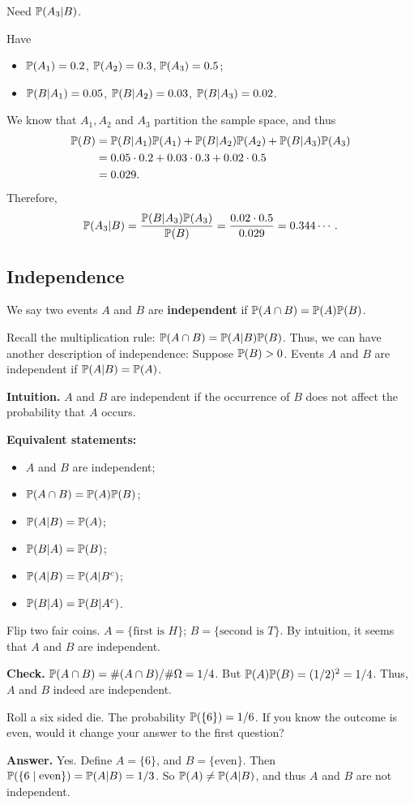 Need $\mathbb{P}(A_3|B)$.

Have
\begin{itemize}
\item $\mathbb{P}(A_1) = 0.2$, $\mathbb{P}(A_2) = 0.3$, $\mathbb{P}(A_3) = 0.5$;
\item $\mathbb{P}(B|A_1) = 0.05$, $\mathbb{P}(B|A_2) = 0.03$, $\mathbb{P}(B|A_3) = 0.02$.
\end{itemize}
We know that $A_1,A_2$ and $A_3$ partition the sample space, and thus
\begin{align*}
  \mathbb{P}(B) & = \mathbb{P}(B|A_1)\mathbb{P}(A_1)+\mathbb{P}(B|A_2)\mathbb{P}(A_2) + \mathbb{P}(B|A_3)\mathbb{P}(A_3)\\
         & = 0.05\cdot 0.2 + 0.03\cdot 0.3 + 0.02 \cdot 0.5\\
  & = 0.029.
\end{align*}
Therefore,
\[
  \mathbb{P}(A_3|B) = \frac{\mathbb{P}(B|A_3)\mathbb{P}(A_3)}{\mathbb{P}(B)} = \frac{0.02\cdot 0.5}{0.029} = 0.344\cdots.
\]
\subsection{Independence}
\label{subsec:indep}
\begin{definition}
  We say two events $A$ and $B$ are \textbf{independent} if $\mathbb{P}(A\cap B) = \mathbb{P}(A)\mathbb{P}(B)$.
\end{definition}
Recall the multiplication rule: $\mathbb{P}(A\cap B) = \mathbb{P}(A|B) \mathbb{P}(B)$. Thus, we can
have another description of independence: Suppose $\mathbb{P}(B)>0$. Events $A$ and $B$
are independent if $\mathbb{P}(A|B) = \mathbb{P}(A)$.

\textbf{Intuition.} $A$ and $B$ are independent if the occurrence of $B$ does
not affect the probability that $A$ occurs.

\textbf{Equivalent statements:}
\begin{itemize}
\item $A$ and $B$ are independent;
\item $\mathbb{P}(A\cap B) = \mathbb{P}(A)\mathbb{P}(B)$;
\item $\mathbb{P}(A|B) = \mathbb{P}(A)$;
\item $\mathbb{P}(B|A) = \mathbb{P}(B)$;
\item $\mathbb{P}(A|B) = \mathbb{P}(A|B^c)$;
\item $\mathbb{P}(B|A) = \mathbb{P}(B|A^c)$.
\end{itemize}
\begin{example}
  Flip two fair coins. $A=\{\text{first is $H$}\}$; $B=\{\text{second is
    $T$}\}$. By intuition, it seems that $A$ and $B$ are independent.
\end{example}
\textbf{Check.} $\mathbb{P}(A\cap B) = \# (A\cap B)/\# \Omega = 1/4$. But $\mathbb{P}(A)
\mathbb{P}(B) = (1/2)^2 = 1/4$. Thus, $A$ and $B$ indeed are independent.
\begin{example}
  Roll a six sided die. The probability $\mathbb{P}(\{6\})=1/6$. If you know the
  outcome is even, would it change your answer to the first question?
\end{example}
\textbf{Answer.} Yes. Define $A = \{6\}$, and $B=\{\text{even}\}$. Then
$\mathbb{P}(\{6\mid \text{even}\}) =\mathbb{P}(A|B) =  1/3$. So $\mathbb{P}(A) \neq \mathbb{P}(A|B)$, and
thus $A$ and $B$ are not independent.

